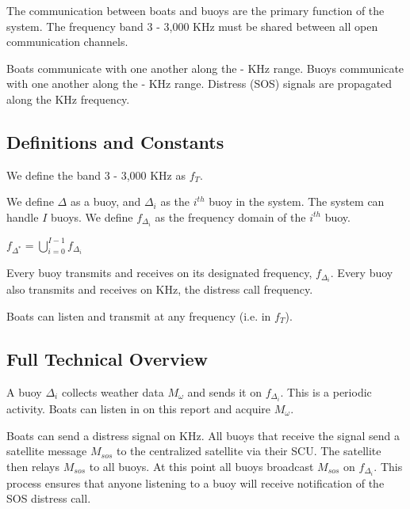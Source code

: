 \documentclass{article}
\begin{document}
		The communication between boats and buoys are the primary function of the system. The frequency band 3 - 3,000 KHz must be shared between all open communication channels.

		\bigskip

		Boats communicate with one another along the \fbl - \fbh KHz range. Buoys communicate with one another along the \fdl - \fdh KHz range. Distress (SOS) signals are propagated along the \fsos KHz frequency.

	\subsection{Definitions and Constants}

		We define the band 3 - 3,000 KHz as $f_{T}$.

		\bigskip

		We define $\Delta$ as a buoy, and $\Delta_{i}$ as the $i^{th}$ buoy in the system. The system can handle $I$ buoys. We define $f_{\Delta_{i}}$ as the frequency domain of the $i^{th}$ buoy.

		\bigskip
		\centering

		$f_{\Delta^{*}} = \bigcup_{i=0}^{I-1}f_{\Delta_{i}}$

		\flushleft
		\bigskip

		Every buoy transmits and receives on its designated frequency, $f_{\Delta_{i}}$. Every buoy also transmits and receives on \fsos KHz, the distress call frequency.

		\bigskip

		Boats can listen and transmit at any frequency (i.e. in $f_{T}$).

	\subsection{Full Technical Overview}

		A buoy $\Delta_{i}$ collects weather data $M_{\omega}$ and sends it on $f_{\Delta_{i}}$. This is a periodic activity. Boats can listen in on this report and acquire $M_{\omega}$.

		\bigskip

		Boats can send a distress signal on \fsos KHz. All buoys that receive the signal send a satellite message $M_{sos}$ to the centralized satellite via their SCU. The satellite then relays $M_{sos}$ to all buoys. At this point all buoys broadcast $M_{sos}$ on $f_{\Delta_{i}}$. This process ensures that anyone listening to a buoy will receive notification of the SOS distress call.

\end{document}
